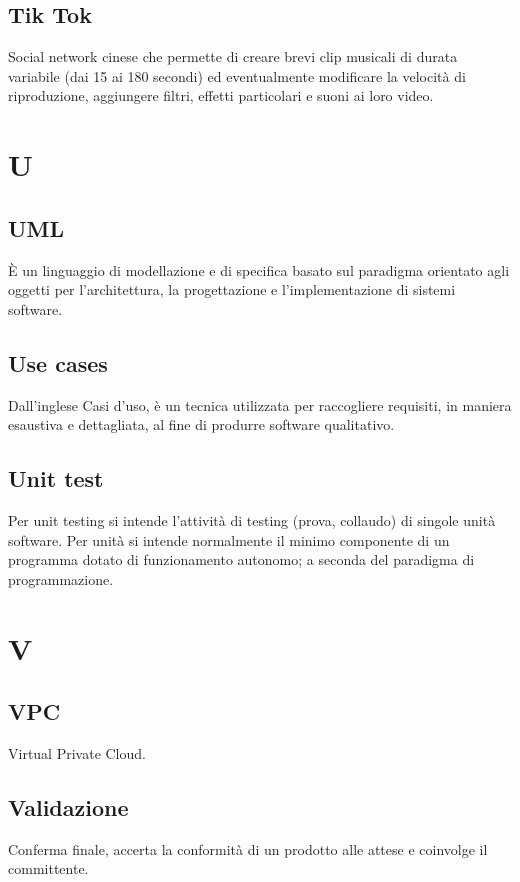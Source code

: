 \documentclass{classes/base}
\begin{document}
        \subsection*{Tik Tok}
        Social network cinese che permette di creare brevi clip musicali di durata variabile (dai 15 ai 180 secondi) ed eventualmente modificare la velocità di riproduzione, aggiungere filtri, effetti particolari e suoni ai loro video.
        
        \newpage  
    \section{U}
        \subsection*{UML}
		È un linguaggio di modellazione e di specifica basato sul paradigma orientato agli oggetti per l'architettura, la progettazione e l'implementazione di sistemi software.

        \subsection*{Use cases} 
        Dall'inglese Casi d'uso, è un tecnica utilizzata per raccogliere requisiti, in maniera esaustiva e dettagliata, al fine di produrre software qualitativo.

        \subsection*{Unit test}
        Per unit testing si intende l'attività di testing (prova, collaudo) di singole unità software. 
        Per unità si intende normalmente il minimo componente di un programma dotato di funzionamento autonomo; a seconda del paradigma di programmazione.
        
        \newpage  
    \section{V}

        \subsection*{VPC}
        Virtual Private Cloud.

        \subsection*{Validazione} 
        Conferma finale, accerta la conformità di un prodotto alle attese e coinvolge il committente.
\end{document}
